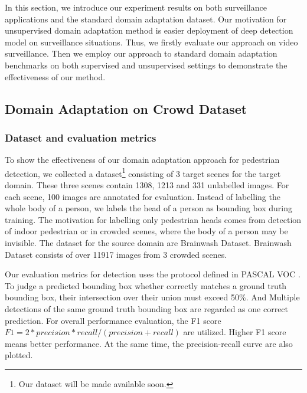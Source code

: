 \documentclass[runningheads]{llncs}
\begin{document}
In this section, we introduce our experiment results on both surveillance applications and the standard domain adaptation dataset. Our motivation for unsupervised domain adaptation method is easier deployment of deep detection model on surveillance situations. Thus, we firstly evaluate our approach on video surveillance. Then we employ our approach to standard domain adaptation benchmarks on both supervised and unsupervised settings to demonstrate the effectiveness of our method.

\subsection{Domain Adaptation on Crowd Dataset}

\subsubsection{Dataset and evaluation metrics}
To show the effectiveness of our domain adaptation approach for pedestrian detection, we collected a dataset\footnote{Our dataset will be made available soon.} consisting of 3 target scenes for the target domain. These three scenes contain 1308, 1213 and 331 unlabelled images. For each scene, 100 images are annotated for evaluation. Instead of labelling the whole body of a person, we labels the head of a person as bounding box during training. The motivation for labelling only pedestrian heads comes from detection of indoor pedestrian or in crowded scenes, where the body of a person may be invisible. The dataset for the source domain are Brainwash Dataset\cite{stewart2015end}. Brainwash Dataset consists of over 11917 images from 3 crowded scenes.

Our evaluation metrics for detection uses the protocol defined in PASCAL VOC \cite{everingham2015pascal}. To judge a predicted bounding box whether correctly matches a ground truth bounding box, their intersection over their union must exceed 50\%. And Multiple detections of the same ground truth bounding box are regarded as one correct prediction. For overall performance evaluation, the F1 score $F1 = 2*precision*recall/(precision+recall)$ are utilized. Higher F1 score means better performance. At the same time, the precision-recall curve are also plotted.
\end{document}
